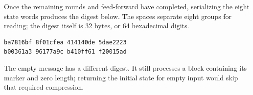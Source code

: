 Once the remaining rounds and feed-forward have completed, serializing the eight state
words produces the digest below. The spaces separate eight groups for reading; the
digest itself is 32 bytes, or 64 hexadecimal digits.
\begin{verbatim}
ba7816bf 8f01cfea 414140de 5dae2223
b00361a3 96177a9c b410ff61 f20015ad
\end{verbatim}
The empty message has a different digest. It still processes a block containing its
marker and zero length; returning the initial state for empty input would skip that
required compression.
